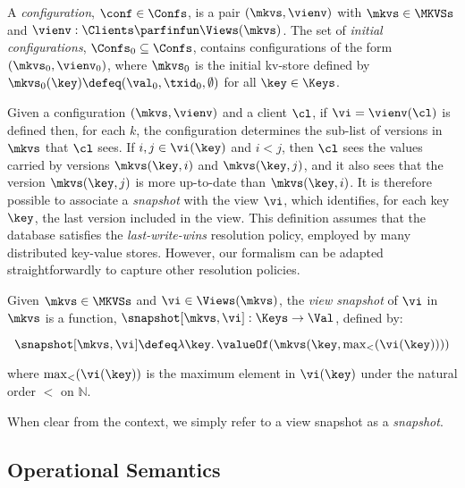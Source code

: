 \SpaceAboveDef
\begin{definition}[Configurations]
\label{def:configuration}
A \emph{configuration}, \(\conf \in \Confs \),  is a pair \( (\mkvs, \vienv)\)
with \(\mkvs \in \MKVSs\) and
\(\vienv : \Clients \parfinfun \Views(\mkvs)\). 
The set of \emph{initial configurations}, \(\Confs_0 \subseteq \Confs\),
contains configurations of the form \( (\mkvs_0, \vienv_0)\), where
\(\mkvs_0\) is the initial kv-store defined by
\(\mkvs_{0}(\key)\defeq  (\val_0, \txid_0, \emptyset)\) for
all \(\key \in \Keys\). 
\end{definition}
\SpaceBelowDef


Given a configuration \((\mkvs, \vienv)\) and a client \(\cl\), 
if \(\vi = \vienv(\cl)\) is defined then, for each \(k\),  the
configuration determines the sub-list of versions in \(\mkvs\) that \(\cl\) sees.
If \(i,j \in \vi(\key)\) and \(i < j\), then \(\cl\) sees the values 
carried by versions \(\mkvs(\key, i)\) and  \(\mkvs(\key, j)\), 
and it also sees that the version \(\mkvs(\key, j)\) is more up-to-date than \(\mkvs(\key, i)\). 
It is therefore possible to associate a \emph{snapshot} with the view \(\vi\), 
which identifies, for each key \(\key\), the last version included in the view. 
This definition assumes that the database satisfies the \emph{last-write-wins}
resolution policy, employed by many distributed key-value stores.
However, our formalism can be adapted straightforwardly  to capture other resolution policies. 

\begin{definition}
\label{def:snapshot}
Given \(\mkvs \in \MKVSs\) and \(\vi \in \Views(\mkvs)\), the
\emph{view snapshot} of \(\vi\) in 
\(\mkvs\) is a function, 
\(\snapshot[\mkvs, \vi] : \Keys \to \Val\), 
defined by: 

\SpaceAboveMath[-15pt]
\[\snapshot[\mkvs, \vi] \defeq \lambda \key \ldotp \valueOf(\mkvs(\key, \textstyle \max_{<}(\vi(\key))))\]
\SpaceBelowMath[-15pt]

\noindent
where \(\max_{<}(\vi(\key))\) is the maximum element in \(\vi(\key)\) under the natural 
order \(<\) on \(\mathbb{N}\).
\end{definition}
\SpaceBelowDef
When clear from the context, we simply refer to a view snapshot as a {\em snapshot}. 

\subsection{Operational Semantics}
\label{subsec:kv-store-op}

